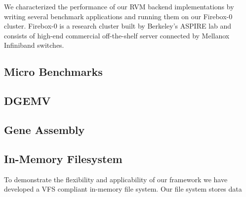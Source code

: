 We characterized the performance of our RVM backend implementations by writing
several benchmark applications and running them on our Firebox-0 cluster.
Firebox-0 is a research cluster built by Berkeley's ASPIRE lab and consists
of high-end commercial off-the-shelf server connected by Mellanox Infiniband
switches.


\subsection{Micro Benchmarks}



\subsection{DGEMV}



\subsection{Gene Assembly}



\subsection{In-Memory Filesystem}

To demonstrate the flexibility and applicability of our framework we have developed a VFS compliant in-memory file system. 
Our file system stores data 


